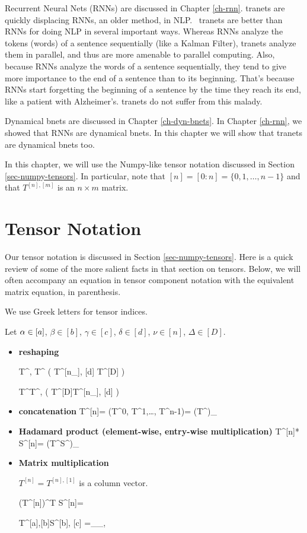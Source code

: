 Recurrent Neural Nets (RNNs)
are discussed in Chapter \ref{ch-rnn}.
tranets are quickly displacing RNNs, 
an older method, in NLP.  tranets are better than RNNs 
for doing NLP in several important ways. Whereas
 RNNs analyze the tokens (words) of a sentence 
sequentially (like a Kalman Filter), 
tranets analyze them in parallel, and thus are more
 amenable to parallel computing. Also, because
 RNNs analyze the words of a sentence sequentially, 
they tend to give more importance to the end 
of a sentence than to its beginning. That's because 
RNNs start forgetting the beginning of a sentence
 by the time they reach its end, like a patient 
with Alzheimer's. tranets do not suffer from this malady.

Dynamical bnets are discussed in Chapter \ref{ch-dyn-bnets}.
In Chapter \ref{ch-rnn},
we showed that RNNs
are dynamical bnets.
In this chapter
 we will show that tranets
are dynamical bnets too.


In this chapter, we 
will use the Numpy-like tensor notation
discussed in Section 
\ref{sec-numpy-tensors}. In particular, note that $[n] = [0:n] = \{0, 1,\ldots, n-1\}$ and that $T^{[n], [m]}$ is an $n\times m$ matrix.

\section{Tensor Notation}
Our tensor notation is discussed in Section
\ref{sec-numpy-tensors}.
Here is a quick review
of some of the more salient
facts in that section on tensors.
Below, we will often accompany
  an equation in tensor
  component notation
  with the equivalent matrix equation,
  in parenthesis.
  
We use  
Greek letters for 
tensor indices.

Let $\alpha\in[a]$, $\beta\in[b]$, $\gamma\in[c]$,
$\delta \in[d]$,
$\nu\in[n]$, $\Delta\in[D]$.


\begin{itemize}

\item{\bf reshaping}

\beq
T^{\nu, \delta}\rarrow T^{\Delta}
\;\;
\left(
T^{[n_\rvh], [d]} \rarrow T^{[D]}
\right)
\eeq

\beq
T^{\Delta}\rarrow T^{\nu, \delta}
\;\;
\left(
T^{[D]}\rarrow T^{[n_\rvh], [d]}
\right)
\eeq

\item {\bf concatenation}
\beq
T^{[n]}= (T^0, T^1,\ldots, T^{n-1})=
(T^\nu)_{\nu\in[n]}
\eeq

\item {\bf Hadamard product (element-wise, entry-wise multiplication)}
\beq
T^{[n]}* S^{[n]}= (T^\nu S^\nu)_{\nu\in[n]}
\eeq


\item {\bf Matrix multiplication}

$T^{[n]}= T^{[n], [1]}$ is a column vector.

\beq
(T^{[n]})^T S^{[n]}=
\eeq

\beq
T^{[a],[b]}S^{[b], [c]}
=
_{\alp_\in [a], \gamma \in [c]}
\eeq

\end{itemize}

